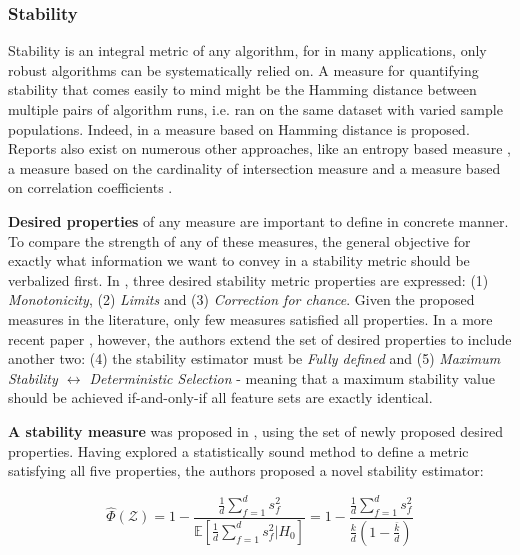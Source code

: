 \documentclass{article}
\begin{document}
\subsubsection{Stability}\label{sec:evaluation-stability}
Stability is an integral metric of any algorithm, for in many applications, only robust algorithms can be systematically relied on. A measure for quantifying stability that comes easily to mind might be the Hamming distance between multiple pairs of algorithm runs, i.e. ran on the same dataset with varied sample populations. Indeed, in \citep{dunne2002solutions} a measure based on Hamming distance is proposed. Reports also exist on numerous other approaches, like an entropy based measure \citep{kvrivzek2007improving}, a measure based on the cardinality of intersection measure \citep{kuncheva2007stability} and a measure based on correlation coefficients \citep{kalousis2007stability}.

\textbf{Desired properties} of any measure are important to define in concrete manner. To compare the strength of any of these measures, the general objective for exactly what information we want to convey in a stability metric should be verbalized first. In \citep{mohana2016survey}, three desired stability metric properties are expressed: (1) \textit{Monotonicity}, (2) \textit{Limits} and (3) \textit{Correction for chance}. Given the proposed measures in the literature, only few measures satisfied all properties. In a more recent paper \citep{nogueira2017stability}, however, the authors extend the set of desired properties to include another two: (4) the stability estimator must be \textit{Fully defined} and (5) \textit{Maximum Stability $\leftrightarrow$ Deterministic Selection} - meaning that a maximum stability value should be achieved if-and-only-if all feature sets are exactly identical.

\textbf{A stability measure} was proposed in \citep{nogueira2017stability}, using the set of newly proposed desired properties. Having explored a statistically sound method to define a metric satisfying all five properties, the authors proposed a novel stability estimator:


\begin{equation}\label{eq:stability-measure}
\hat{\Phi}(\mathcal{Z})=1-\frac{\frac{1}{d} \sum_{f=1}^{d} s_{f}^{2}}{\mathbb{E}\left[\frac{1}{d} \sum_{f=1}^{d} s_{f}^{2} | H_{0}\right]}=1-\frac{\frac{1}{d} \sum_{f=1}^{d} s_{f}^{2}}{\frac{k}{d}\left(1-\frac{\bar{k}}{d}\right)}
\end{equation}
\end{document}
